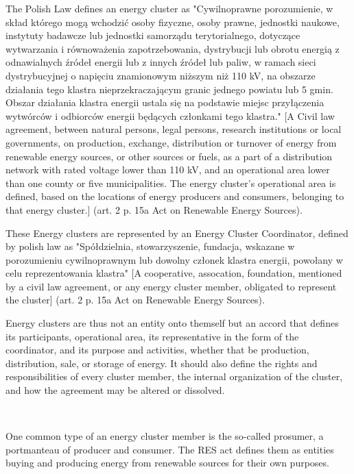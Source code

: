 \par The Polish Law defines an energy cluster as "Cywilnoprawne porozumienie, w skład którego mogą wchodzić osoby fizyczne, osoby prawne, jednostki naukowe, instytuty badawcze lub jednostki samorządu terytorialnego, dotyczące wytwarzania i równoważenia zapotrzebowania, dystrybucji lub obrotu energią z odnawialnych źródeł energii lub z innych źródeł lub paliw, w ramach sieci dystrybucyjnej o napięciu znamionowym niższym niż 110 kV, na obszarze działania tego klastra nieprzekraczającym granic jednego powiatu lub 5 gmin. Obszar działania klastra energii ustala się na podstawie miejsc przyłączenia wytwórców i odbiorców energii będących członkami tego klastra." [A Civil law agreement, between natural persons, legal persons, research institutions or local governments, on production, exchange, distribution or turnover of energy from renewable energy sources, or other sources or fuels, as a part of a distribution network with rated voltage lower than 110 kV, and an operational area lower than one county or five municipalities. The energy cluster's operational area is defined, based on the locations of energy producers and consumers, belonging to that energy cluster.]  (art. 2 p. 15a Act on Renewable Energy Sources).
\par These Energy clusters are represented by an Energy Cluster Coordinator, defined by polish law as "Spółdzielnia, stowarzyszenie, fundacja, wskazane w porozumieniu cywilnoprawnym lub dowolny członek klastra energii, powołany w celu reprezentowania klastra" [A cooperative, assocation, foundation, mentioned by a civil law agreement, or any energy cluster member, obligated to represent the cluster] (art. 2 p. 15a Act on Renewable Energy Sources).
\par Energy clusters are thus not an entity onto themself but an accord that defines its participants, operational area, its representative in the form of the coordinator, and its purpose and activities, whether that be production, distribution, sale, or storage of energy. It should also define the rights and responsibilities of every cluster member, the internal organization of the cluster, and how the agreement may be altered or dissolved. 
\par ~
\par One common type of an energy cluster member is the so-called prosumer, a portmanteau of producer and consumer. The RES act defines them as entities buying and producing energy from renewable sources for their own purposes. 

